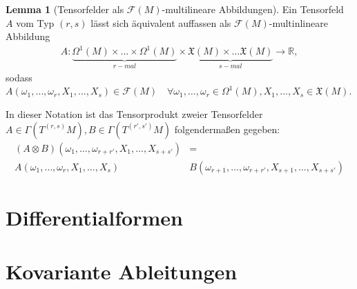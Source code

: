 \documentclass[a4paper]{scrreprt}
\numberwithin{equation}{chapter}
\newcommand{\R}{\mathbb{R}}
\newcommand{\sm}{\mathcal{F}}
\newcommand{\vf}{\mathfrak{X}}
\theoremstyle{definition}
\newtheorem{lemma}[defn]{Lemma}
\begin{document}
		\begin{lemma}[Tensorfelder als $\sm(M)$-multilineare Abbildungen]
			Ein Tensorfeld $A$ vom Typ $(r,s)$ lässt sich äquivalent auffassen als $\sm(M)$-multinlineare Abbildung
			\begin{align*}
				A\colon \underbrace{\Omega^1(M)\times\ldots\times\Omega^1(M)}_{r-mal}\times\underbrace{\vf(M)\times\ldots\vf(M)}_{s-mal}\rightarrow \R,
			\end{align*}
			sodass $A(\omega_1,\ldots,\omega_r,X_1,\ldots,X_s)\in\sm(M)\quad\forall\omega_1,\ldots,\omega_r\in\Omega^1(M),X_1,\ldots,X_s\in\vf(M)$.
			
			In dieser Notation ist das Tensorprodukt zweier Tensorfelder $A\in\Gamma(T^{(r,s)}M), B\in \Gamma(T^{(r',s')}M)$ folgendermaßen gegeben:
			\begin{align*}
				(A\otimes B)(\omega_1,\ldots,\omega_{r+r'},X_1,\ldots,X_{s+s'})&=\\
				A(\omega_1,\ldots,\omega_r,X_1,\ldots,X_s) &B(\omega_{r+1},\ldots,\omega_{r+r'},X_{s+1},\ldots,X_{s+s'})
			\end{align*}
		\end{lemma}
		


\chapter{Differentialformen}\label{chap:Differentialformen}


\chapter{Kovariante Ableitungen}
\end{document}
